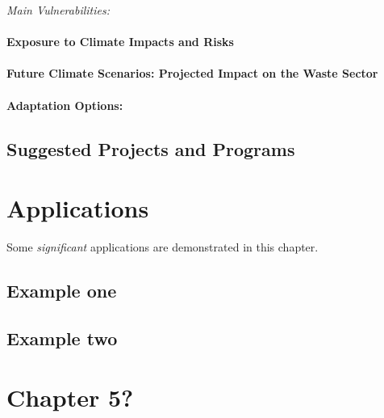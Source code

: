 \documentclass[
]{book}
\begin{document}
\emph{Main Vulnerabilities:}

\hypertarget{exposure-to-climate-impacts-and-risks-9}{%
\subsubsection{Exposure to Climate Impacts and Risks}\label{exposure-to-climate-impacts-and-risks-9}}

\hypertarget{future-climate-scenarios-projected-impact-on-the-waste-sector}{%
\subsubsection{Future Climate Scenarios: Projected Impact on the Waste Sector}\label{future-climate-scenarios-projected-impact-on-the-waste-sector}}

\hypertarget{adaptation-options-9}{%
\subsubsection{Adaptation Options:}\label{adaptation-options-9}}

\hypertarget{suggested-projects-and-programs}{%
\section{Suggested Projects and Programs}\label{suggested-projects-and-programs}}

\hypertarget{applications}{%
\chapter{Applications}\label{applications}}

Some \emph{significant} applications are demonstrated in this chapter.

\hypertarget{example-one}{%
\section{Example one}\label{example-one}}

\hypertarget{example-two}{%
\section{Example two}\label{example-two}}

\hypertarget{chapter-5}{%
\chapter{Chapter 5?}\label{chapter-5}}
\end{document}
